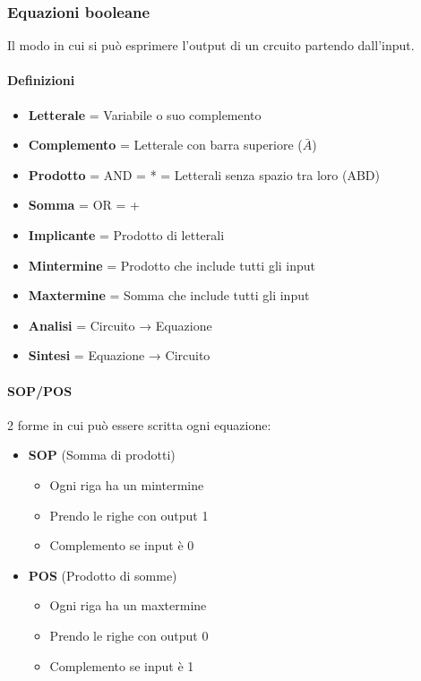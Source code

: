 \documentclass{article}
\begin{document}
\subsubsection{Equazioni booleane}

Il modo in cui si può esprimere l'output di un crcuito partendo dall'input.

\paragraph{Definizioni}

\begin{itemize}
    \item \textbf{Letterale} = Variabile o suo complemento
    \item \textbf{Complemento} = Letterale con barra superiore ($\bar{A}$)
    \item \textbf{Prodotto} = AND = * = Letterali senza spazio tra loro (ABD)
    \item \textbf{Somma} = OR = +
    \item \textbf{Implicante} = Prodotto di letterali
    \item \textbf{Mintermine} = Prodotto che include tutti gli input
    \item \textbf{Maxtermine} = Somma che include tutti gli input
    \item \textbf{Analisi} = Circuito → Equazione
    \item \textbf{Sintesi} = Equazione → Circuito
\end{itemize}

\paragraph{SOP/POS}

2 forme in cui può essere scritta ogni equazione:
\begin{itemize}
    \item \textbf{SOP} (Somma di prodotti) 
        \begin{itemize}
            \item Ogni riga ha un mintermine
            \item Prendo le righe con output 1
            \item Complemento se input è 0
        \end{itemize}
    \item \textbf{POS} (Prodotto di somme)
            \begin{itemize}
            \item Ogni riga ha un maxtermine
            \item Prendo le righe con output 0
            \item Complemento se input è 1
        \end{itemize}
\end{itemize}
\end{document}
